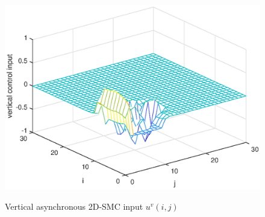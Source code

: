\documentclass[journal,final,twocolumn]{IEEEtran}
\begin{document}
\begin{figure}[!htb]
	\centering\includegraphics[scale=0.6]{./simulations/v-controll-input_eps.eps}\\ 
	\caption{Vertical asynchronous 2D-SMC input $u^{v}(i,j)$}
	\label{fig8}
\end{figure}
\end{document}
